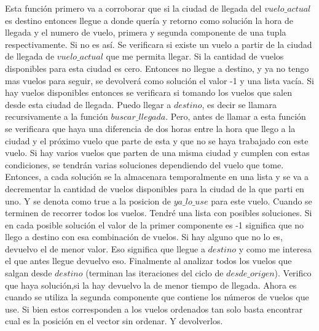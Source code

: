 \documentclass{article}
\begin{document}
Esta función primero va a corroborar que si la ciudad de llegada del $vuelo\_actual$ es destino entonces llegue a donde quería y retorno como solución la hora de llegada y el numero de vuelo, primera y segunda componente de una tupla respectivamente. Si no es así. Se verificara si existe un vuelo a partir de la ciudad de llegada de $vuelo\_actual$ que me permita llegar. Si la cantidad de vuelos disponibles para esta ciudad es cero. Entonces no llegue a destino, y ya no tengo mas vuelos para seguir, se devolverá como solución el valor -1 y una lista vacía. Si hay vuelos disponibles entonces se verificara si tomando los vuelos que salen desde esta ciudad de llegada. Puedo llegar a $destino$, es decir se llamara recursivamente a la función $buscar\_llegada$. Pero, antes de llamar a esta función se verificara que haya una diferencia de dos horas entre la hora que llego a la ciudad y el próximo vuelo que parte de esta y que no se haya trabajado con este vuelo. Si hay varios vuelos que parten de una misma ciudad y cumplen con estas condiciones, se tendrán varias soluciones dependiendo del vuelo que tome. Entonces, a cada solución se la almacenara temporalmente en una lista y se va a decrementar la cantidad de vuelos disponibles para la ciudad de la que parti en uno. Y se denota como true a la posicion de $ya\_lo\_use$ para este vuelo. Cuando se terminen de recorrer todos los vuelos. Tendré una lista con posibles soluciones. Si en cada posible solución el valor de la primer componente es -1 significa que no llego a destino con esa combinación de vuelos. Si hay alguno que no lo es, devuelvo el de menor valor. Eso significa que llegue a $destino$ y como me interesa el que antes llegue devuelvo eso.
Finalmente al analizar todos los vuelos que salgan desde $destino$ (terminan las iteraciones del ciclo de $desde\_origen$). Verifico que haya solución,si la hay devuelvo la de menor tiempo de llegada. Ahora es cuando se utiliza la segunda componente que contiene los números de vuelos que use. Si bien estos corresponden a los vuelos ordenados tan solo basta encontrar cual es la posición en el vector sin ordenar. Y devolverlos.  
\end{document}
